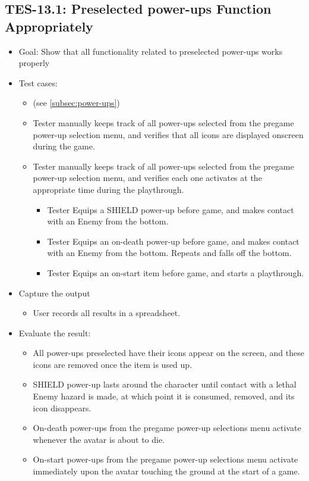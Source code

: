 \subsection{TES-13.1: Preselected power-ups Function Appropriately }
\begin{itemize}
\item Goal: Show that all functionality related to preselected power-ups works properly

\item Test cases: 
\begin{itemize}
\item (see \ref{subsec:power-ups})
\item Tester manually keeps track of all power-ups selected from the pregame power-up selection menu, and verifies that all
icons are displayed onscreen during the game.
\item Tester manually keeps track of all power-ups selected from the pregame power-up selection menu, and verifies each one 
activates at the appropriate time during the playthrough.
\begin{itemize}
\item Tester Equips a SHIELD power-up before game, and makes contact with an Enemy from the bottom.
\item Tester Equips an on-death power-up before game, and makes contact with an Enemy from the bottom. Repeats and falls off the bottom.
\item Tester Equips an on-start item before game, and starts a playthrough.
\end{itemize}
\end{itemize}

\item Capture the output 
\begin{itemize}
\item User records all results in a spreadsheet.
\end{itemize}

\item Evaluate the result: 
\begin{itemize}
\item All power-ups preselected have their icons appear on the screen, and these icons are removed once the item is used up.
\item SHIELD power-up lasts around the character until contact with a lethal Enemy hazard is made, at which point it is consumed, removed, and its icon disappears.
\item On-death power-ups from the pregame power-up selections menu activate whenever the avatar is about to die.
\item On-start power-ups from the pregame power-up selections menu activate immediately upon the avatar touching the ground at the start of a game.


\end{itemize}
\end{itemize}
